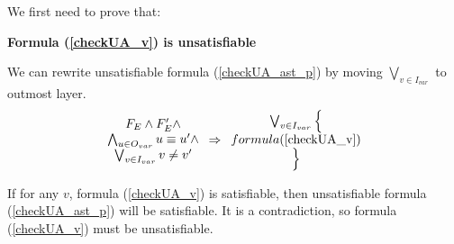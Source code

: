 \documentclass[journal]{IEEEtran}
\begin{document}
We first need to prove that:
\vspace{0.2cm}
\begin{theorem}[]\label{thm_checkUA_v}
\textbf{Formula (\ref{checkUA_v}) is unsatisfiable}
\end{theorem}
\begin{IEEEproof}
%
We can rewrite unsatisfiable formula (\ref{checkUA_ast_p}) by moving $\bigvee_{v\in I_{var}}$ to outmost layer.
\begin{displaymath}\label{checkUA_rew}
\begin{array}{c}
F_E\wedge F'_E\wedge \\
\bigwedge_{u\in O_{var}} u\equiv u'\wedge \\
\bigvee_{v\in I_{var}}v\ne v'
\end{array}
\Rightarrow
\begin{array}{c}
\bigvee_{v\in I_{var}}\Big\{\\
formula(\ref{checkUA_v})\\
\Big\}
\end{array}
\end{displaymath}

If for any $v$,
formula (\ref{checkUA_v}) is satisfiable,
then unsatisfiable formula (\ref{checkUA_ast_p}) will be satisfiable.
It is a contradiction,
so formula (\ref{checkUA_v}) must be unsatisfiable.
\end{IEEEproof}
\end{document}

